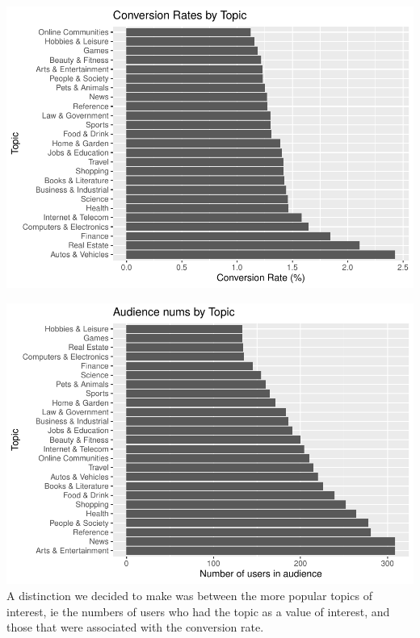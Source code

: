 \documentclass[]{article}
\newenvironment{Shaded}{\begin{snugshade}}{\end{snugshade}}
\newcommand{\DataTypeTok}[1]{\textcolor[rgb]{0.13,0.29,0.53}{#1}}
\newcommand{\KeywordTok}[1]{\textcolor[rgb]{0.13,0.29,0.53}{\textbf{#1}}}
\newcommand{\NormalTok}[1]{#1}
\newcommand{\OperatorTok}[1]{\textcolor[rgb]{0.81,0.36,0.00}{\textbf{#1}}}
\newcommand{\StringTok}[1]{\textcolor[rgb]{0.31,0.60,0.02}{#1}}
\begin{document}
\includegraphics{Final-Report_files/figure-latex/gathering-test-1.pdf}

\begin{Shaded}
\end{Shaded}

\includegraphics{Final-Report_files/figure-latex/gathering-test-2.pdf} A
distinction we decided to make was between the more popular topics of
interest, ie the numbers of users who had the topic as a value of
interest, and those that were associated with the conversion rate.
\end{document}
